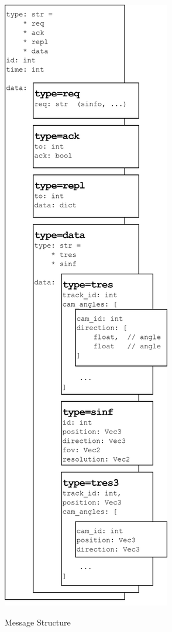 \begin{figure}[H]
\begin{minipage}{0.5\textwidth}
	\end{minipage}%
	\hfill
	\begin{minipage}{0.38\textwidth} %
		\centering
		\includegraphics[width=\textwidth]{figures/SS_Protocol_Message}
		\caption{Message Structure}
		\label{fig:ssprotocolmessage}
	\end{minipage}
\end{figure}

